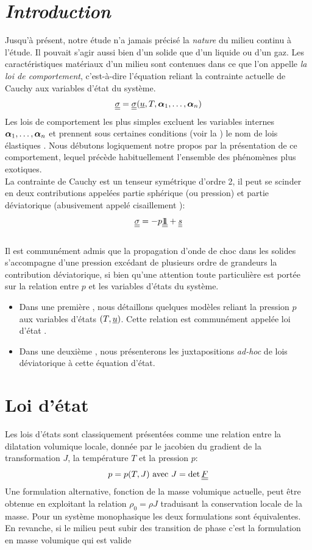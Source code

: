\documentclass[10pt]{book}
\begin{document}
\section*{\emph{Introduction}}
Jusqu'à présent, notre étude n'a jamais précisé la \emph{nature} du milieu continu à l'étude. Il pouvait s'agir aussi bien d'un solide que d'un liquide ou d'un gaz. Les caractéristiques matériaux d'un milieu sont contenues dans ce que l'on appelle \emph{la loi de comportement}, c'est-à-dire l'équation reliant la contrainte actuelle de Cauchy aux variables d'état du système.
\begin{equation}
\underline{\underline{\sigma}} = \underline{\underline{\sigma}}(\underline{u}, T, \boldsymbol{\alpha}_{1},\dots,\boldsymbol{\alpha}_{n})
\label{eq:Loi_compo_gen}
\end{equation}
Les lois de comportement les plus simples excluent les variables internes $\boldsymbol{\alpha}_{1},\dots,\boldsymbol{\alpha}_{n}$ et prennent sous certaines conditions (voir la ) le nom de \og lois élastiques \fg{}. Nous débutons logiquement notre propos par la présentation de ce comportement, lequel précède habituellement l'ensemble des phénomènes plus exotiques. \\

La contrainte de Cauchy est un tenseur symétrique d'ordre 2, il peut se scinder en deux contributions appelées \og partie sphérique \fg{}(ou pression) et \og partie déviatorique \fg{} (abusivement appelé \og cisaillement \fg{}):
$$\underline{\underline{\sigma}} = -p\underline{\underline{1\!\!1}} +\underline{\underline{s}}$$\\

Il est communément admis que la propagation d'onde de choc dans les solides s'accompagne d'une pression excédant de plusieurs ordre de grandeurs la contribution déviatorique, si bien qu'une attention toute particulière est portée sur la relation entre $p$ et les variables d'états du système.
\begin{itemize}
\item Dans une première , nous détaillons quelques modèles reliant la pression $p$ aux variables d'états $(T,\underline{u})$. Cette relation est communément appelée \og loi d'état \fg{}. 
\item Dans une deuxième , nous présenterons les juxtapositions \emph{ad-hoc} de lois déviatorique à cette équation d'état.
\end{itemize}
\section{Loi d'état}\label{Section:Loi d'état}
Les lois d'états sont classiquement présentées comme une relation entre la dilatation volumique locale, donnée par le jacobien du gradient de la transformation $J$, la température $T$ et la pression $p$:
$$p = p(T,J) \text{ avec } J=\det\underline{\underline{F}}$$
Une formulation alternative, fonction de la masse volumique actuelle, peut être obtenue en exploitant la relation $\rho_{0}=\rho J$ traduisant la conservation locale de la masse. Pour un système monophasique les deux formulations sont équivalentes. En revanche, si le milieu peut subir des transition de phase c'est la formulation en masse volumique qui est valide
\end{document}
